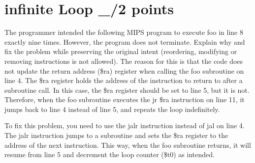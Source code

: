 \documentclass{article}
\begin{document}
\section{infinite Loop \_/2 points}
The programmer intended the following MIPS program to execute foo in line 8 exactly nine times.
However, the program does not terminate. Explain why and fix the problem while preserving the
original intent (reordering, modifying or removing instructions is not allowed).\newline
The reason for this is that the code does not update the return address (\$ra) register when 
calling the foo subroutine on line 4. The \$ra register holds the address of the instruction 
to return to after a subroutine call. In this case, the \$ra register should be set to line 5, 
but it is not. Therefore, when the foo subroutine executes the jr \$ra instruction on line 11, 
it jumps back to line 4 instead of line 5, and repeats the loop indefinitely.

To fix this problem, you need to use the jalr instruction instead of jal on line 4. The jalr 
instruction jumps to a subroutine and sets the \$ra register to the address of the next 
instruction. This way, when the foo subroutine returns, it will resume from line 5 and 
decrement the loop counter (\$t0) as intended.
\end{document}
